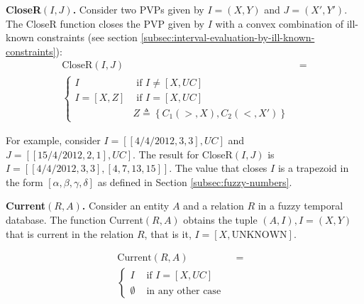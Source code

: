 \begin{definition}
\label{def:close-r-a-pvp}
\textbf{CloseR$\left(I, J\right)$.}
Consider two PVPs given by $I = \left(X, Y \right)$ and $J = \left(X', Y' \right)$. The CloseR function closes the PVP given by $I$ with a convex combination of ill-known constraints (see section \ref{subsec:interval-evaluation-by-ill-known-constraints}):
\begin{align}
\label{eq:close-r-a-pvp}
\text{CloseR}\left(I, J\right) &= \\
\begin{cases}
\nonumber
I   & \mbox{ if } I \neq \left[X, UC \right] \\
I = \left[X, Z \right] & \mbox{ if } I = \left[X, UC \right] \\
& Z \triangleq \left \lbrace C_1\left(>, X \right), C_2\left(<, X' \right) \right \rbrace
\end{cases}
\end{align}
\end{definition}

For example, consider $I = \left[\left[4/4/2012, 3, 3\right] , UC\right]$ and $J = \left[ \left[15/4/2012,2,1\right], UC\right]$. The result for CloseR$\left(I, J\right)$  is $I = \left[ \left[4/4/2012, 3, 3\right], \left[4,7,13,15 \right] \right]$. The value that closes $I$ is a trapezoid in the form $\left[ \alpha, \beta, \gamma, \delta \right]$ as defined in Section \ref{subsec:fuzzy-numbers}.

\begin{definition}
\label{def:pvp-current-in-relation}
\textbf{Current$\left(R, A \right)$.}
Consider an entity $A$ and a relation $R$ in a fuzzy temporal database. The function Current$\left(R, A \right)$ obtains the tuple $\left(A, I \right), I = \left(X, Y \right)$ that is current in the relation $R$, that is it, $I = \left[X , \text{UNKNOWN} \right]$.

\begin{align}
\label{eq:pvp-current-in-relation}
\mbox{Current} \left(R, A \right) &=& \\ 
\begin{cases}
\nonumber
I & \mbox{ if } I = \left[X, UC \right] \\
\emptyset & \mbox{ in any other case }
\end{cases}
\end{align}
\end{definition}

